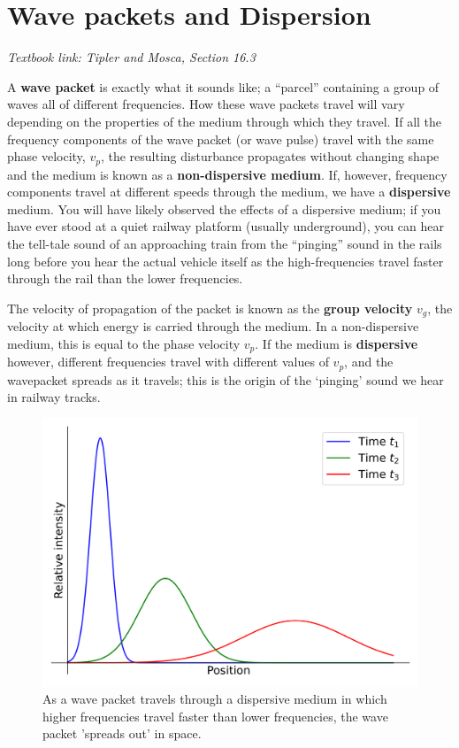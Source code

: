 \documentclass[
]{book}
\begin{document}
\hypertarget{sec:ch12-wavepackets}{%
\chapter{Wave packets and Dispersion}\label{sec:ch12-wavepackets}}

\emph{Textbook link: Tipler and Mosca, Section 16.3}

A \textbf{wave packet} is exactly what it sounds like; a ``parcel'' containing a group of waves all of different frequencies. How these wave packets travel will vary depending on the properties of the medium through which they travel. If all the frequency components of the wave packet (or wave pulse) travel with the same phase velocity, \(v_p\), the resulting disturbance propagates without changing shape and the medium is known as a \textbf{non-dispersive medium}. If, however, frequency components travel at different speeds through the medium, we have a \textbf{dispersive} medium. You will have likely observed the effects of a dispersive medium; if you have ever stood at a quiet railway platform (usually underground), you can hear the tell-tale sound of an approaching train from the ``pinging'' sound in the rails long before you hear the actual vehicle itself as the high-frequencies travel faster through the rail than the lower frequencies.

The velocity of propagation of the packet is known as the \textbf{group velocity} \(v_g\), the velocity at which energy is carried through the medium. In a non-dispersive medium, this is equal to the phase velocity \(v_p\). If the medium is \textbf{dispersive} however, different frequencies travel with different values of \(v_p\), and the wavepacket spreads as it travels; this is the origin of the `pinging' sound we hear in railway tracks.

\begin{figure}

{\centering \includegraphics[width=0.7\linewidth]{visualisations/ch12-wavepacketdispersion1} 

}

\caption{As a wave packet travels through a dispersive medium in which higher frequencies travel faster than lower frequencies, the wave packet 'spreads out' in space.}\label{fig:ch12-dispersionillustration1}
\end{figure}
\end{document}
